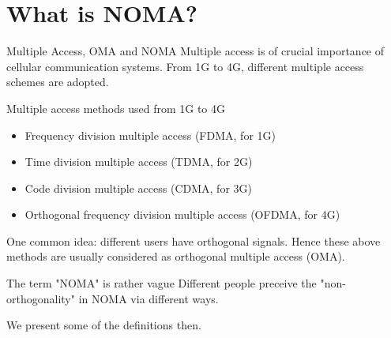 \documentclass[aspectratio=43, 10pt]{beamer}
\begin{document}
\section{What is NOMA?}
  \begin{frame}[t]{Multiple Access, OMA and NOMA}
    Multiple access is of crucial importance of cellular communication systems. From 1G to 4G, different multiple access schemes are adopted. 
    \begin{block}{Multiple access methods used from 1G to 4G}
        \begin{itemize}
        \item Frequency division multiple access (FDMA, for 1G)
        \item Time division multiple access (TDMA, for 2G)
        \item Code division multiple access (CDMA, for 3G)
        \item Orthogonal frequency division multiple access (OFDMA, for 4G)
        \end{itemize}
    \end{block}
    One common idea: different users have orthogonal signals. Hence these above methods are usually considered as orthogonal multiple access (OMA). 
    \vfill
    
    \pause
    
    \begin{block}{The term "NOMA" is rather vague}
        Different people preceive the "non-orthogonality" in NOMA via different ways. 
        
        We present some of the definitions then. 
    \end{block}
  \end{frame}
\end{document}
